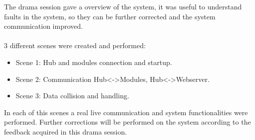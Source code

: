 The drama session gave a overview of the system, it was useful to understand faults in the system, so they can be further corrected and the system communication improved.
\\
\\3 different scenes were created and performed:\\
\begin{itemize}
	\item Scene 1: Hub and modules connection and startup.
	\item Scene 2: Communication Hub\textless-\textgreater Modules, Hub\textless-\textgreater Webserver.
	\item Scene 3: Data collision and handling.
\end{itemize}
In each of this scenes a real live communication and system functionalities were performed. 
Further corrections will be performed on the system according to the feedback acquired in this drama session.





